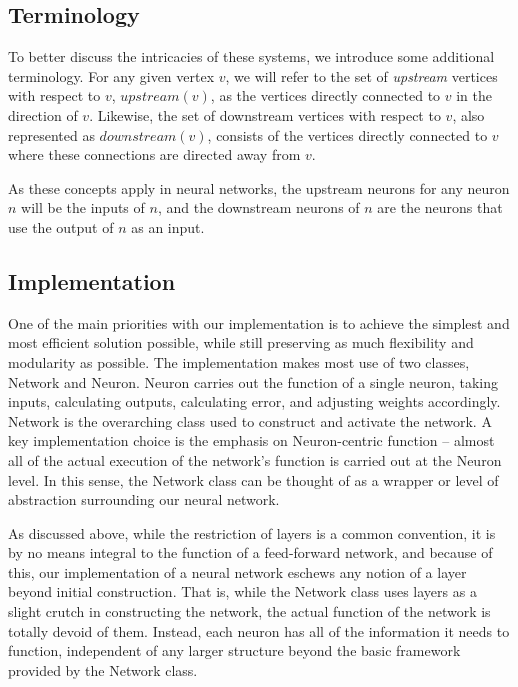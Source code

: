 \documentclass[a4paper, 11pt]{article} %
\begin{document}
\subsection*{Terminology}

To better discuss the intricacies of these systems, we introduce some additional terminology.  For any given vertex $v$, we will refer to the set of \textit{upstream} vertices with respect to $v$, $upstream(v)$, as the vertices directly connected to $v$ in the direction of $v$.  Likewise, the set of downstream vertices with respect to $v$, also represented as $downstream(v)$, consists of the vertices directly connected to $v$ where these connections are directed away from $v$.

As these concepts apply in neural networks, the upstream neurons for any neuron $n$ will be the inputs of $n$, and the downstream neurons of $n$ are the neurons that use the output of $n$ as an input.

\subsection*{Implementation}

One of the main priorities with our implementation is to achieve the simplest and most efficient solution possible, while still preserving as much flexibility and modularity as possible.  The implementation makes most use of two classes, Network and Neuron.  Neuron carries out the function of a single neuron, taking inputs, calculating outputs, calculating error, and adjusting weights accordingly.  Network is the overarching class used to construct and activate the network.  A key implementation choice is the emphasis on Neuron-centric function -- almost all of the actual execution of the network's function is carried out at the Neuron level.  In this sense, the Network class can be thought of as a wrapper or level of abstraction surrounding our neural network.

As discussed above, while the restriction of layers is a common convention, it is by no means integral to the function of a feed-forward network, and because of this, our implementation of a neural network eschews any notion of a layer beyond initial construction.  That is, while the Network class uses layers as a slight crutch in constructing the network, the actual function of the network is totally devoid of them.  Instead, each neuron has all of the information it needs to function, independent of any larger structure beyond the basic framework provided by the Network class.
\end{document}
